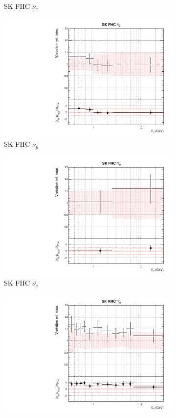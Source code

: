 \begin{figure}
\begin{subfigure}{0.24\textwidth}
  \caption{SK FHC $\nu_e$}
  \label{fig:}
\end{subfigure}
\begin{subfigure}{0.24\textwidth}
  \centering
  \includegraphics[width=0.95\linewidth]{figs/datflux10}
  \caption{SK FHC $\bar{\nu_{\mu}}$}
  \label{fig:}
\end{subfigure}
\begin{subfigure}{0.24\textwidth}
  \centering
  \includegraphics[width=0.95\linewidth]{figs/datflux11}
  \caption{SK FHC $\bar{\nu_{e}}$}
  \label{fig:}
\end{subfigure}
\begin{subfigure}{0.24\textwidth}
  \centering
  \includegraphics[width=0.95\linewidth]{figs/datflux12}

\end{subfigure}
\end{figure}
